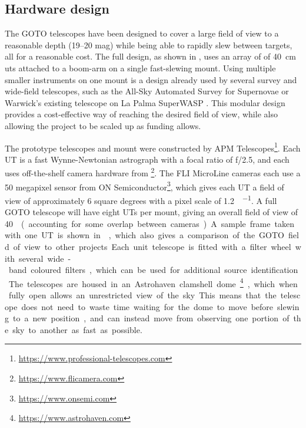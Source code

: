 \begin{colsection}
\begin{colsection}
\end{colsection}

\newpage
\subsection{Hardware design}
\label{sec:goto_design}
\begin{colsection}

The GOTO telescopes have been designed to cover a large field of view to a reasonable depth (19--20 mag) while being able to rapidly slew between targets, all for a reasonable cost. The full design, as shown in , uses an array of of \SI{40}{\cm} \glspl{ut} attached to a boom-arm on a single fast-slewing mount. Using multiple smaller instruments on one mount is a design already used by several survey and wide-field telescopes, such as the All-Sky Automated Survey for Supernovae  \citep[ASAS-SN,][]{ASAS-SN} or Warwick's existing telescope on La Palma SuperWASP  \citep{SuperWASP}. This modular design provides a cost-effective way of reaching the desired field of view, while also allowing the project to be scaled up as funding allows.

The prototype telescopes and mount were constructed by APM Telescopes\footnote{\url{https://www.professional-telescopes.com}}. Each UT is a fast Wynne-Newtonian astrograph with a focal ratio of f/2.5, and each uses off-the-shelf camera hardware from \footnote{\url{https://www.flicamera.com}}. The FLI MicroLine cameras each use a 50 megapixel sensor from ON Semiconductor\footnote{\url{https://www.onsemi.com}}, which gives each UT a field of view of approximately 6 square degrees with a pixel scale of \SI[per-mode=symbol]{1.2}{\arcsec\per\pixel}. A full GOTO telescope will have eight UTs per mount, giving an overall field of view of \SI{40}{\square\deg} (accounting for some overlap between cameras). A sample frame taken with one UT is shown in , which also gives a comparison of the GOTO field of view to other projects. Each unit telescope is fitted with a filter wheel with several wide-band coloured filters, which can be used for additional source identification. The telescopes are housed in an Astrohaven clamshell dome\footnote{\url{https://www.astrohaven.com}}, which when fully open allows an unrestricted view of the sky. This means that the telescope does not need to waste time waiting for the dome to move before slewing to a new position, and can instead move from observing one portion of the sky to another as fast as possible.


\end{colsection}
\end{colsection}
